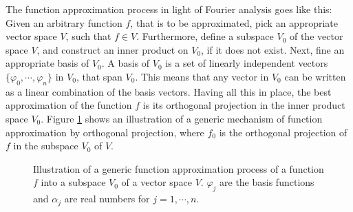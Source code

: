 \documentclass[../Main/thesis.tex]{subfiles}
\begin{document}
\justify
The function approximation process in light of Fourier analysis goes like this: Given an arbitrary function $f$, that is to be approximated, pick an appropriate vector space $V$, such that $f\in V$. Furthermore, define a subspace $V_{0}$ of the vector space $V$, and construct an inner product on $V_{0}$, if it does not exist. Next, fine an appropriate basis of $V_{0}$.  A basis of $V_{0}$ is a set of linearly independent vectors   $\{  \varphi_{0}, \cdots,\varphi_{n}\}$ in $V_{0}$, that span $V_{0}$. This means that any vector in $V_{0}$ can be written as a linear combination of the basis vectors.
\justify
 Having all this in place, the best approximation of the function $f$ is its orthogonal projection in the inner product space $V_{0}$. Figure \ref{figure:il} shows an illustration of a generic mechanism of function approximation by orthogonal projection, where $f_{0}$ is the orthogonal projection of $f$ in the subspace $V_{0}$ of $V$.
\justify
\begin{figure}[H]
\begin{center}
\end{center}
\caption{Illustration of a generic function approximation process of a function $f$ into a subspace $V_{0}$ of a vector space $V$. $\varphi_{j}$ are the basis functions and $\alpha_{j}$ are real numbers for $j=1,\cdots,n$.}
\label{figure:il}
\end{figure}
\end{document}
